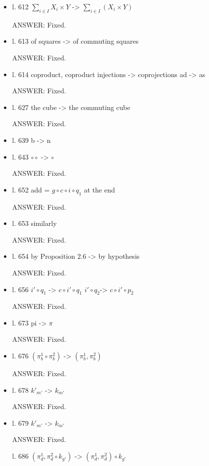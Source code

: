 \documentclass[english,11pt,a4paper]{article}
\begin{document}
\begin{itemize}
\item l. 612 $\sum_{i\in I}X_i\times Y$ -> $\sum_{i\in I}(X_i\times Y)$ 

ANSWER: Fixed.

\item l. 613 of squares -> of commuting squares

ANSWER: Fixed.

\item l. 614 coproduct, coproduct injections -> coprojections
ad -> as

ANSWER: Fixed.

\item l. 627 the cube -> the commuting cube

ANSWER: Fixed.

\item l. 639 b -> n

\item l. 643 $\circ\circ$ -> $\circ$

ANSWER: Fixed.

\item l. 652 add = $g \circ c \circ i \circ q_1$ at the end

ANSWER: Fixed.

\item l. 653 similarly

ANSWER: Fixed.

\item l. 654 by Proposition 2.6 -> by hypothesis

ANSWER: Fixed.

\item l. 656 $i' \circ q_1$ -> $c \circ i' \circ q_1$
$i' \circ q_2 $-> $c \circ i' \circ p_2$

ANSWER: Fixed.

\item l. 673 pi -> $\pi$

ANSWER: Fixed.

\item l. 676 $(\pi^1_b \circ \pi^2_b)$ -> $(\pi^1_b , \pi^2_b)$

ANSWER: Fixed.

\item  l. 678 $k'_{m'}$ -> $k_{m'}$

ANSWER: Fixed.

\item l. 679 $k'_{m'}$ -> $k_{m'}$

ANSWER: Fixed.

l. 686 $(\pi^1_d , \pi^2_d \circ k_{g'})$ -> $(\pi^1_d , \pi^2_d) \circ k_{g'}$


\end{itemize}
\end{document}
